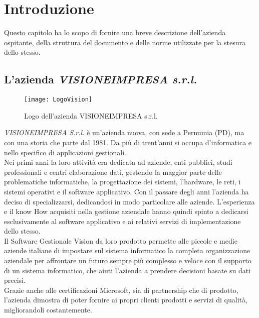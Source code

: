 
\chapter{Introduzione}
\label{cap:introduzione}
Questo capitolo ha lo scopo di fornire una breve descrizione dell'azienda ospitante, della struttura del documento e delle norme utilizzate per la stesura dello stesso.

\section{L'azienda \emph{VISIONEIMPRESA s.r.l.}}

\begin{figure}[!h] 
    \centering 
    \texttt{[image: LogoVision]} 
    \caption{Logo dell'azienda VISIONEIMPRESA s.r.l.}
\end{figure}

\emph{VISIONEIMPRESA S.r.l.} è un’azienda nuova, con sede a Pernumia (PD), ma con una storia che parte dal 1981. Da più di trent’anni si occupa d’informatica e nello specifico di applicazioni gestionali.\\
Nei primi anni la loro attività era dedicata ad aziende, enti pubblici, studi professionali e centri elaborazione dati, gestendo la maggior parte delle problematiche informatiche, la progettazione dei sistemi, l’hardware, le reti, i sistemi operativi e il software applicativo. Con il passare degli anni l’azienda ha deciso di specializzarsi, dedicandosi in modo particolare alle aziende. L’esperienza e il know How acquisiti nella gestione aziendale hanno quindi spinto a dedicarsi esclusivamente al software applicativo e ai relativi servizi di implementazione dello stesso.\\
Il Software Gestionale Vision da loro prodotto permette alle piccole e medie aziende italiane di impostare sul sistema informatico la completa organizzazione aziendale per affrontare un futuro sempre più complesso e veloce con il supporto di un sistema informatico, che aiuti l’azienda a prendere decisioni basate su dati precisi.\\
Grazie anche alle certificazioni Microsoft, sia di partnership che di prodotto, l’azienda dimostra di poter fornire ai propri clienti prodotti e servizi di qualità, migliorandoli costantemente.

